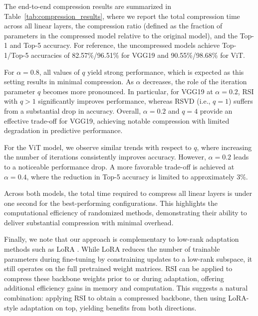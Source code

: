 \documentclass[twoside,leqno,onecolumn]{article}
\begin{document}
The end-to-end compression results are summarized in Table~\ref{tab:compression_results}, where we report the total compression time across all linear layers, the compression ratio (defined as the fraction of parameters in the compressed model relative to the original model), and the Top-1 and Top-5 accuracy. For reference, the uncompressed models achieve Top-1/Top-5 accuracies of 82.57\%/96.51\% for VGG19 and 90.55\%/98.68\% for ViT.

For \(\alpha = 0.8\), all values of \(q\) yield strong performance, which is expected as this setting results in minimal compression. As \(\alpha\) decreases, the role of the iteration parameter \(q\) becomes more pronounced. In particular, for VGG19 at \(\alpha = 0.2\), RSI with \(q>1\) significantly improves performance, whereas RSVD (i.e., \(q=1\)) suffers from a substantial drop in accuracy. Overall, \(\alpha = 0.2\) and \(q = 4\) provide an effective trade-off for VGG19, achieving notable compression with limited degradation in predictive performance.

For the ViT model, we observe similar trends with respect to \(q\), where increasing the number of iterations consistently improves accuracy. However, $\alpha = 0.2$ leads to a noticeable performance drop. A more favorable trade-off is achieved at \(\alpha = 0.4\), where the reduction in Top-5 accuracy is limited to approximately 3\%.

Across both models, the total time required to compress all linear layers is under one second for the best-performing configurations. This highlights the computational efficiency of randomized methods, demonstrating their ability to deliver substantial compression with minimal overhead.

Finally, we note that our approach is complementary to low-rank adaptation methods such as LoRA \cite{hu2022lora}. While LoRA reduces the number of trainable parameters during fine-tuning by constraining updates to a low-rank subspace, it still operates on the full pretrained weight matrices. RSI can be applied to compress these backbone weights prior to or during adaptation, offering additional efficiency gains in memory and computation. This suggests a natural combination: applying RSI to obtain a compressed backbone, then using LoRA-style adaptation on top, yielding benefits from both directions.
\end{document}
